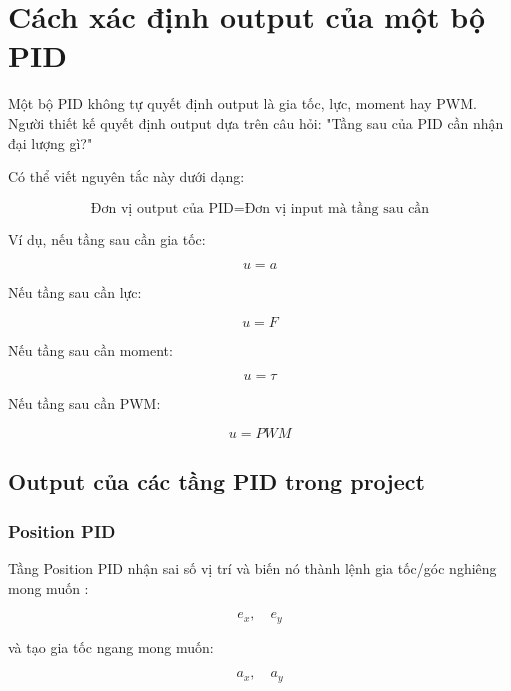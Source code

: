 \section{Cách xác định output của một bộ PID}

Một bộ PID không tự quyết định output là gia tốc, lực, moment hay PWM.
Người thiết kế quyết định output dựa trên câu hỏi: "Tầng sau của PID cần nhận đại lượng gì?"

Có thể viết nguyên tắc này dưới dạng:

\begin{equation}
    \boxed{
    \text{Đơn vị output của PID}
    =
    \text{Đơn vị input mà tầng sau cần}
    }
\end{equation}

Ví dụ, nếu tầng sau cần gia tốc:

\begin{equation}
    u = a
\end{equation}

Nếu tầng sau cần lực:

\begin{equation}
    u = F
\end{equation}

Nếu tầng sau cần moment:

\begin{equation}
    u = \tau
\end{equation}

Nếu tầng sau cần PWM:

\begin{equation}
    u = PWM
\end{equation}

\subsection{Output của các tầng PID trong project}

\subsubsection{Position PID}

Tầng Position PID nhận sai số vị trí và biến nó thành lệnh gia tốc/góc nghiêng mong muốn \cite{mahony2012multirotor}:

\begin{equation}
    e_x,\quad e_y
\end{equation}

và tạo gia tốc ngang mong muốn:

\begin{equation}
    a_x,\quad a_y
\end{equation}

